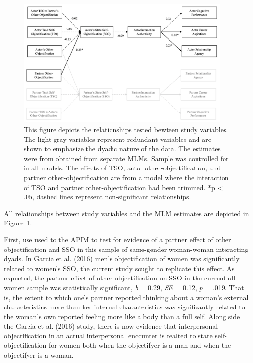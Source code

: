 \documentclass[man]{apa6}
\begin{document}
\begin{figure}
\includegraphics[width=400px]{figures/SEMfigure} \caption{This figure depicts the relationships tested bewteen study variables. The light gray variables represent redundant variables and are shown to emphasize the dyadic nature of the data. The estimates were from obtained from separate MLMs. Sample was controlled for in all models. The effects of TSO, actor other-objectification, and partner other-objectification are from a model where the interaction of TSO and partner other-objectification had been trimmed. *p < .05, dashed lines represent non-significant relationships.}\label{fig:semfigure}
\end{figure}

All relationships between study variables and the MLM estimates are
depicted in Figure~\ref{fig:semfigure}.

First, use used to the APIM to test for evidence of a partner effect of
other objectification and SSO in this sample of same-gender woman-woman
interacting dyads. In Garcia et al. (2016) men's objectification of
women was significantly related to women's SSO, the current study sought
to replicate this effect. As expected, the partner effect of
other-objectification on SSO in the current all-women sample was
statistically significant, \emph{b} = 0.29, \emph{SE} = 0.12, \emph{p} =
.019. That is, the extent to which one's partner reported thinking about
a woman's external characteristics more than her internal
characteristics was significantly related to the woman's own reported
feeling more like a body than a full self. Along side the Garcia et al.
(2016) study, there is now evidence that interpersonal objectification
in an actual interpersonal encounter is realted to state
self-objectification for women both when the objectifyer is a man and
when the objectifyer is a woman.
\end{document}
